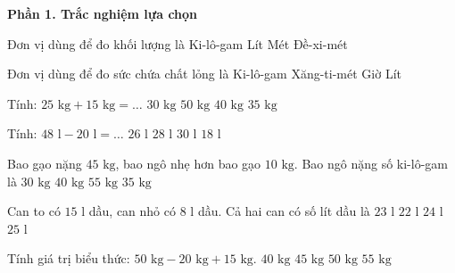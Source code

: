 \textbf{Phần 1. Trắc nghiệm lựa chọn}

\begin{ex} %
Đơn vị dùng để đo khối lượng là
\choice
{\True Ki-lô-gam}
{Lít}
{Mét}
{Đề-xi-mét}
\end{ex}

\begin{ex} %
Đơn vị dùng để đo sức chứa chất lỏng là
\choice
{Ki-lô-gam}
{Xăng-ti-mét}
{Giờ}
{\True Lít}
\end{ex}

\begin{ex} %
Tính: $25\text{ kg} + 15\text{ kg} = \dots$
\choice
{$30\text{ kg}$}
{$50\text{ kg}$}
{\True $40\text{ kg}$}
{$35\text{ kg}$}
\end{ex}

\begin{ex} %
Tính: $48\text{ l} - 20\text{ l} = \dots$
\choice
{$26\text{ l}$}
{\True $28\text{ l}$}
{$30\text{ l}$}
{$18\text{ l}$}
\end{ex}

\begin{ex} %
Bao gạo nặng $45\text{ kg}$, bao ngô nhẹ hơn bao gạo $10\text{ kg}$. Bao ngô nặng số ki-lô-gam là
\choice
{$30\text{ kg}$}
{$40\text{ kg}$}
{$55\text{ kg}$}
{\True $35\text{ kg}$}
\end{ex}

\begin{ex} %
Can to có $15\text{ l}$ dầu, can nhỏ có $8\text{ l}$ dầu. Cả hai can có số lít dầu là
\choice
{\True $23\text{ l}$}
{$22\text{ l}$}
{$24\text{ l}$}
{$25\text{ l}$}
\end{ex}

\begin{ex} %
Tính giá trị biểu thức: $50\text{ kg} - 20\text{ kg} + 15\text{ kg}$.
\choice
{$40\text{ kg}$}
{\True $45\text{ kg}$}
{$50\text{ kg}$}
{$55\text{ kg}$}
\end{ex}

